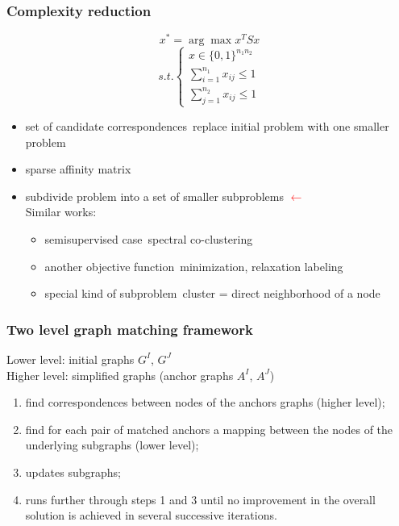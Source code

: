 \documentclass[handout]{beamer}
\begin{document}
\begin{frame}
\frametitle{Complexity reduction}
\begin{block}{}
\tiny
$$x^* = \arg\max x^TSx $$
$$ s.t. \begin{cases}
		x\in\{0,1\}^{n_1n_2} \\
		\sum_{i=1}^{n_1}x_{ij}\le 1 \\
		\sum_{j=1}^{n_2}x_{ij}\le 1
\end{cases}$$
\end{block}

\begin{itemize}
\item set of candidate correspondences~{\tiny replace initial problem with one smaller problem}
\item sparse affinity matrix
\item subdivide problem into a set of smaller subproblems
\hspace{10pt}\textcolor{red}{$\leftarrow$\\}
Similar works:
			\begin{itemize}
				\item semisupervised case~{\tiny spectral co-clustering}
				\item another objective function~{\tiny minimization, relaxation labeling}
				\item special kind of subproblem~{\tiny cluster = direct neighborhood of a node}
			\end{itemize}
\end{itemize}
\end{frame}
\begin{frame}
\frametitle{Two level graph matching framework}
Lower level: initial graphs $G^I$, $G^J$\\
Higher level: simplified graphs (anchor graphs $A^I$, $A^J$)\\
\begin{enumerate}
\item find correspondences between nodes of the anchors graphs (higher level);
\item find for each pair of matched anchors a mapping between the nodes of the
underlying subgraphs (lower level);
\item updates subgraphs;
\item runs further through steps 1 and 3 until no improvement in
the overall solution is achieved in several successive iterations.
\end{enumerate}
\end{frame}
\end{document}
